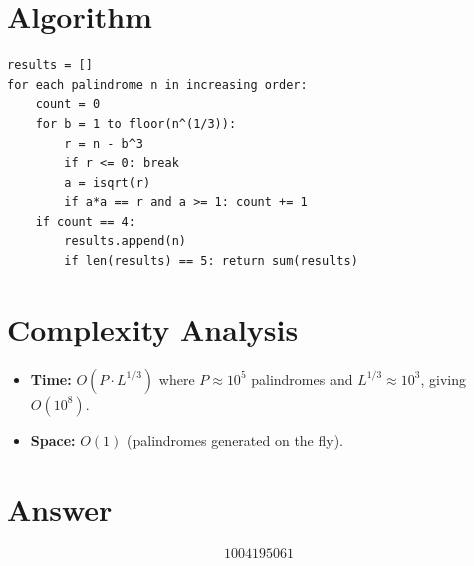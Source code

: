 \documentclass[a4paper,12pt]{article}
\begin{document}
\section{Algorithm}

\begin{verbatim}
results = []
for each palindrome n in increasing order:
    count = 0
    for b = 1 to floor(n^(1/3)):
        r = n - b^3
        if r <= 0: break
        a = isqrt(r)
        if a*a == r and a >= 1: count += 1
    if count == 4:
        results.append(n)
        if len(results) == 5: return sum(results)
\end{verbatim}

\section{Complexity Analysis}
\begin{itemize}
    \item \textbf{Time:} $O(P \cdot L^{1/3})$ where $P \approx 10^5$ palindromes and $L^{1/3} \approx 10^3$, giving $O(10^8)$.
    \item \textbf{Space:} $O(1)$ (palindromes generated on the fly).
\end{itemize}

\section{Answer}

\[
\boxed{1004195061}
\]
\end{document}
